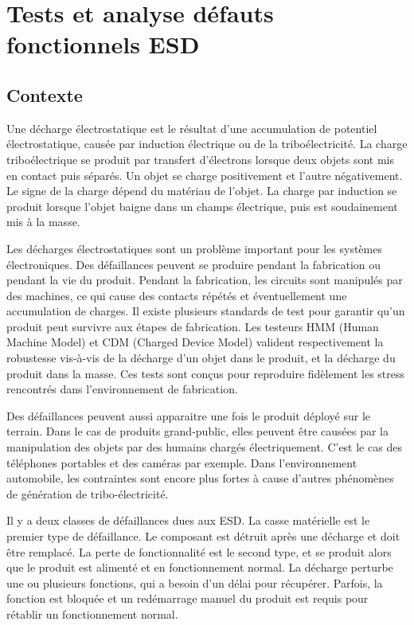\chapter{Tests et analyse défauts fonctionnels ESD}
\label{chap:1}
\section{Contexte}

Une décharge électrostatique est le résultat d'une accumulation de potentiel électrostatique, causée par induction électrique ou de la triboélectricité.
La charge triboélectrique se produit par transfert d'électrons lorsque deux objets sont mis en contact puis séparés.
Un objet se charge positivement et l'autre négativement.
Le signe de la charge dépend du matériau de l'objet.
La charge par induction se produit lorsque l'objet baigne dans un champs électrique, puis est soudainement mis à la masse.

Les décharges électrostatiques sont un problème important pour les systèmes électroniques.
Des défaillances peuvent se produire pendant la fabrication ou pendant la vie du produit.
Pendant la fabrication, les circuits sont manipulés par des machines, ce qui cause des contacts répétés et éventuellement une accumulation de charges.
Il existe plusieurs standards de test pour garantir qu'un produit peut survivre aux étapes de fabrication.
Les testeurs HMM (Human Machine Model) et CDM (Charged Device Model) valident respectivement la robustesse vis-à-vis de la décharge d'un objet dans le produit, et la décharge du produit dans la masse.
Ces tests sont conçus pour reproduire fidèlement les stress rencontrés dans l'environnement de fabrication.

Des défaillances peuvent aussi apparaitre une fois le produit déployé sur le terrain.
Dans le cas de produits grand-public, elles peuvent être causées par la manipulation des objets par des humains chargés électriquement.
C'est le cas des téléphones portables et des caméras par exemple.
Dans l'environnement automobile, les contraintes sont encore plus fortes à cause d'autres phénomènes de génération de tribo-électricité.

Il y a deux classes de défaillances dues aux ESD.
La casse matérielle est le premier type de défaillance.
Le composant est détruit après une décharge et doit être remplacé.
La perte de fonctionnalité est le second type, et se produit alors que le produit est alimenté et en fonctionnement normal.
La décharge perturbe une ou plusieurs fonctions, qui a besoin d'un délai pour récupérer.
Parfois, la fonction est bloquée et un redémarrage manuel du produit est requis pour rétablir un fonctionnement normal.

